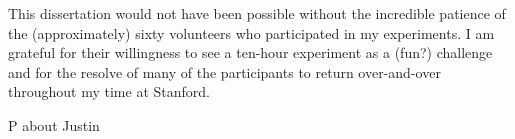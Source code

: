 This dissertation would not have been possible without the incredible patience of the (approximately) sixty volunteers who participated in my experiments. I am grateful for their willingness to see a ten-hour experiment as a (fun?) challenge and for the resolve of many of the participants to return over-and-over throughout my time at Stanford.

P about Justin